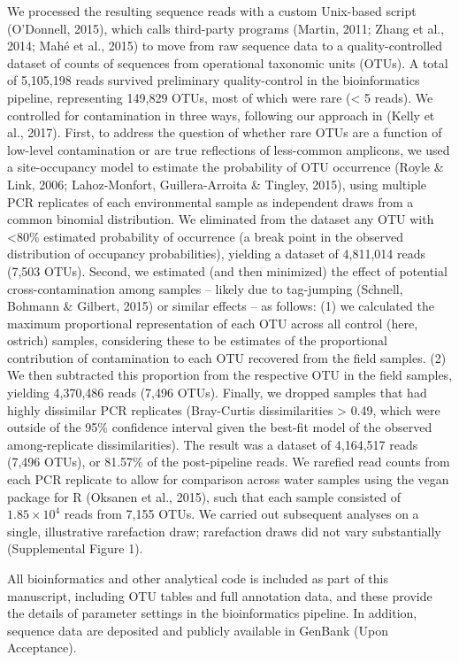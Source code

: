 \documentclass[fleqn,10pt,lineno]{wlpeerj} %
\begin{document}
We processed the resulting sequence reads with a custom Unix-based
script (O'Donnell, 2015), which calls third-party programs (Martin,
2011; Zhang et al., 2014; Mahé et al., 2015) to move from raw sequence
data to a quality-controlled dataset of counts of sequences from
operational taxonomic units (OTUs). A total of 5,105,198 reads survived
preliminary quality-control in the bioinformatics pipeline, representing
149,829 OTUs, most of which were rare (\textless{} 5 reads). We
controlled for contamination in three ways, following our approach in
(Kelly et al., 2017). First, to address the question of whether rare
OTUs are a function of low-level contamination or are true reflections
of less-common amplicons, we used a site-occupancy model to estimate the
probability of OTU occurrence (Royle \& Link, 2006; Lahoz-Monfort,
Guillera-Arroita \& Tingley, 2015), using multiple PCR replicates of
each environmental sample as independent draws from a common binomial
distribution. We eliminated from the dataset any OTU with
\textless{}80\% estimated probability of occurrence (a break point in
the observed distribution of occupancy probabilities), yielding a
dataset of 4,811,014 reads (7,503 OTUs). Second, we estimated (and then
minimized) the effect of potential cross-contamination among samples --
likely due to tag-jumping (Schnell, Bohmann \& Gilbert, 2015) or similar
effects -- as follows: (1) we calculated the maximum proportional
representation of each OTU across all control (here, ostrich) samples,
considering these to be estimates of the proportional contribution of
contamination to each OTU recovered from the field samples. (2) We then
subtracted this proportion from the respective OTU in the field samples,
yielding 4,370,486 reads (7,496 OTUs). Finally, we dropped samples that
had highly dissimilar PCR replicates (Bray-Curtis dissimilarities
\textgreater{} 0.49, which were outside of the 95\% confidence interval
given the best-fit model of the observed among-replicate
dissimilarities). The result was a dataset of 4,164,517 reads (7,496
OTUs), or 81.57\% of the post-pipeline reads. We rarefied read counts
from each PCR replicate to allow for comparison across water samples
using the vegan package for R (Oksanen et al., 2015), such that each
sample consisted of \(1.85 \times 10^4\) reads from 7,155 OTUs. We
carried out subsequent analyses on a single, illustrative rarefaction
draw; rarefaction draws did not vary substantially (Supplemental Figure
1).

All bioinformatics and other analytical code is included as part of this
manuscript, including OTU tables and full annotation data, and these
provide the details of parameter settings in the bioinformatics
pipeline. In addition, sequence data are deposited and publicly
available in GenBank (Upon Acceptance).
\end{document}
